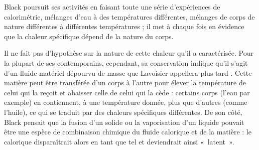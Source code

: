 	Black poursuit ses activités en faisant toute une série d'expériences de calorimétrie, mélanges d'eau à des températures différentes, mélanges de corps de nature différentes à différentes températures ; il met à chaque fois en évidence que la chaleur spécifique dépend de la nature du corps.

	Il ne fait pas d'hypothèse sur la nature de cette chaleur qu'il a caractérisée. Pour la plupart de ses contemporains, cependant, sa conservation indique qu'il s'agit d'un fluide matériel dépourvu de masse que Lavoisier appellera plus tard . Cette matière peut être transférée d'un corps à l'autre pour élever la température de celui qui la reçoit et abaisser celle de celui qui la cède : certains corps (l'eau par exemple) en contiennent, à une température donnée, plus que d'autres (comme l'huile), ce qui se traduit par des chaleurs spécifiques différentes. De son côté, Black pensait que la fusion d'un solide ou la vaporisation d'un liquide pouvait être une espèce de combinaison chimique du fluide calorique et de la matière : le calorique disparaîtrait alors en tant que tel et deviendrait ainsi «~latent~»\cite{locqueneux1996}.

\atendofhistorysection
